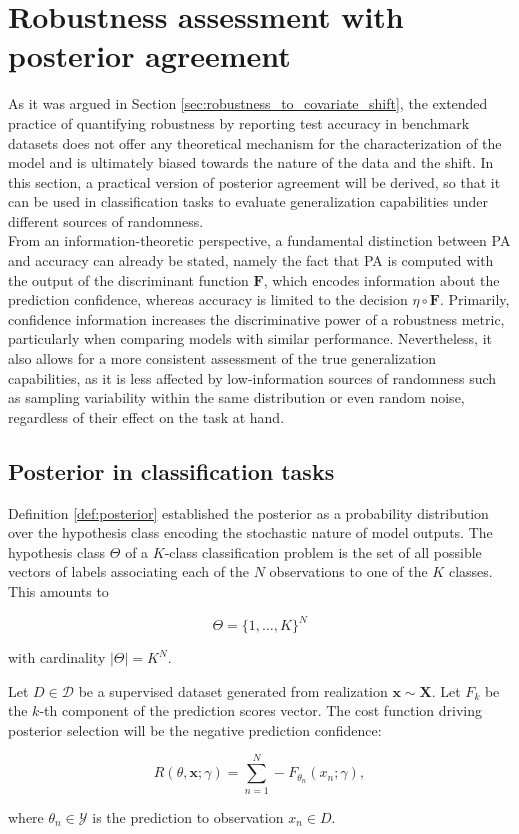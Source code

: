 \section{Robustness assessment with posterior agreement}

As it was argued in Section \ref{sec:robustness_to_covariate_shift}, the extended practice 
of quantifying robustness by reporting test accuracy in benchmark datasets 
does not offer any theoretical mechanism for the characterization of the model 
and is ultimately biased towards the nature of the data and the shift. In this section, a practical 
version of posterior agreement will be derived, so that it can be used in 
classification tasks to evaluate generalization capabilities under different sources of randomness. \\

From an information-theoretic perspective, a fundamental distinction between PA and 
accuracy can already be stated, namely the fact that PA is computed with the output 
of the discriminant function $\mathbf{F}$, which encodes information about the prediction confidence, 
whereas accuracy is limited to the decision $\eta \circ \mathbf{F}$. Primarily, confidence information 
increases the discriminative power of a robustness metric, particularly 
when comparing models with similar performance. Nevertheless, it also allows for a 
more consistent assessment of the true generalization capabilities, as it is less affected by low-information 
sources of randomness such as sampling variability within the same distribution or
even random noise, regardless of their effect on the task at hand. \\

\subsection{Posterior in classification tasks}

Definition \ref{def:posterior} established the posterior as a probability
distribution over the hypothesis class encoding the stochastic nature of
model outputs. The hypothesis class $\Theta$ of a $K$-class classification problem is the set of
all possible vectors of labels associating each of the $N$ observations to one of the $K$ classes. This amounts to

$$
\Theta = \{1, \dots, K \}^N
$$

with cardinality $|\Theta| = K^N$.

\begin{proposition}
    Let $D \in \mathcal{D}$ be a supervised dataset generated from realization $\bm{x} \sim \bm{X}$. Let $F_k$ 
    be the $k$-th component of the prediction scores vector. The cost function driving posterior selection 
    will be the negative prediction confidence:

    $$
    R(\theta, \bm{x}; \gamma) = \sum_{n=1}^N - F_{\theta_n}(x_n; \gamma),
    $$

    where $\theta_n \in \mathcal{Y}$ is the prediction to observation $x_n \in D$.
\end{proposition}

